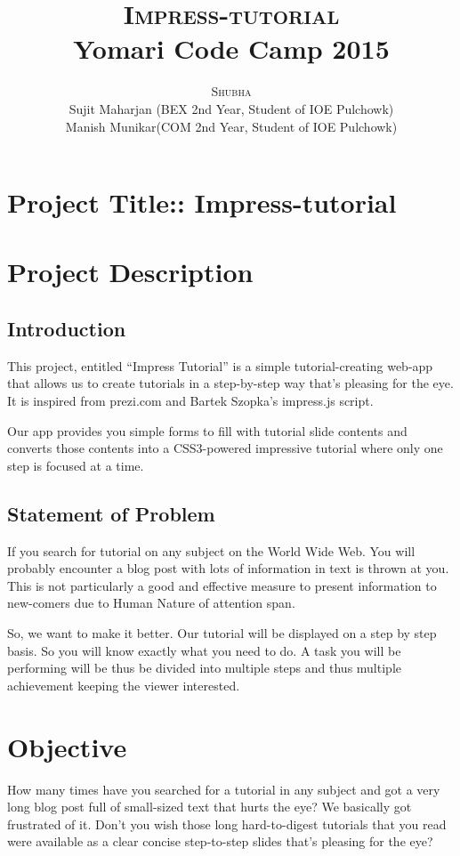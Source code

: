 \documentclass[12pt,a4paper]{article}
\title{
  {\Huge{\textsc{Impress-tutorial}}}\\
  {\Large{Yomari Code Camp 2015}}
}
\author{\small{\textsc{Shubha} \\ Sujit Maharjan (BEX 2nd Year, Student of IOE Pulchowk) \\ Manish Munikar(COM 2nd Year, Student of IOE Pulchowk)}}
\begin{document}
\maketitle
\section{Project Title:: Impress-tutorial}

\section{Project Description}

\subsection{Introduction}
This project, entitled “Impress Tutorial” is a simple tutorial-creating web-app that allows us to create tutorials in a step-by-step way that's pleasing for the eye. It is inspired from prezi.com and Bartek Szopka's impress.js script.

Our app provides you simple forms to fill with tutorial slide contents and converts those contents into a CSS3-powered impressive tutorial where only one step is focused at a time.

\subsection{Statement of Problem}
If you search for tutorial on any subject on the World Wide Web. You will probably encounter a blog post with lots of information in text is thrown at you. This is not particularly a good and effective measure to present information to new-comers due to Human Nature of attention span.

So, we want to make it better. Our tutorial will be displayed on a step by step basis. So you will know exactly what you need to do. A task you will be performing will be thus be divided into multiple steps and thus multiple achievement keeping the viewer interested. 

\section{Objective}

How many times have you searched for a tutorial in any subject and got a very long blog post full of small-sized text that hurts the eye? We basically got frustrated of it. Don't you wish those long hard-to-digest tutorials that you read were available as a clear concise step-to-step slides that's pleasing for the eye?
\end{document}
